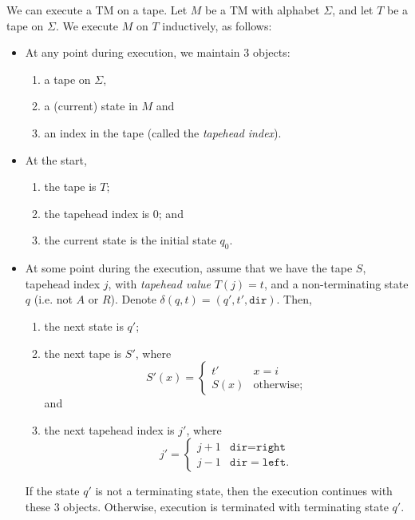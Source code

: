 We can execute a TM on a tape. Let $M$ be a TM with alphabet $\Sigma$, and let $T$ be a tape on $\Sigma$. We execute $M$ on $T$ inductively, as follows:
\begin{itemize}
    \item At any point during execution, we maintain 3 objects:
    \begin{enumerate}
        \item a tape on $\Sigma$, 
        \item a (current) state in $M$ and 
        \item an index in the tape (called the \emph{tapehead index}). 
    \end{enumerate}
    
    \item At the start,
    \begin{enumerate}
        \item the tape is $T$; 
        \item the tapehead index is $0$; and
        \item the current state is the initial state $q_0$. 
    \end{enumerate}
    
    \item At some point during the execution, assume that we have the tape $S$, tapehead index $j$, with \emph{tapehead value} $T(j) = t$, and a non-terminating state $q$ (i.e. not $A$ or $R$). Denote $\delta(q, t) = (q', t', \texttt{dir})$. Then, 
    \begin{enumerate}
        \item the next state is $q'$;
        \item the next tape is $S'$, where
        \[S'(x) = \begin{cases}
            t' & x = i \\
            S(x) & \text{otherwise};
        \end{cases}\]
        and
        \item the next tapehead index is $j'$, where
        \[j' = \begin{cases}
            j+1 & \texttt{dir} = \texttt{right} \\
            j-1 & \texttt{dir} = \texttt{left}.
        \end{cases}\]
    \end{enumerate}
    If the state $q'$ is not a terminating state, then the execution continues with these 3 objects. Otherwise, execution is terminated with terminating state $q'$.
\end{itemize}

